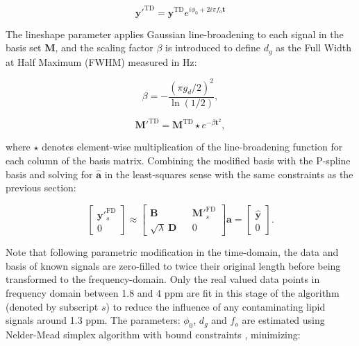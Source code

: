 \documentclass[num-refs]{wiley-article}
\begin{document}
\begin{equation}
  \mathbf{y'}^{\mathrm{TD}} = \mathbf{y}^{\mathrm{TD}} e^{i \phi_{0} + 2 i \pi f_{o} \mathbf{t}}
\end{equation}

The lineshape parameter applies Gaussian line-broadening to each signal in the basis set $\mathbf{M}$, and the scaling factor $\beta$ is introduced to define $d_{g}$ as the Full Width at Half Maximum (FWHM) measured in Hz:

\begin{equation}
  \beta = -\frac{{(\pi g_{d} / 2)}^{2}}{\ln(1/2)},
\end{equation}

\begin{equation}
  \mathbf{M}'^{\mathrm{TD}} = \mathbf{M}^{\mathrm{TD}} \star e^{-\beta \mathbf{t}^{2}},
\end{equation}

where $\star$ denotes element-wise multiplication of the line-broadening function for each column of the basis matrix. Combining the modified basis with the P-spline basis and solving for $\hat{\mathbf{a}}$ in the least-squares sense with the same constraints as the previous section:

\begin{equation}
  \begin{bmatrix}
    \textbf{y}'^{\mathrm{FD}}_{s} \\ 0
  \end{bmatrix}
  \approx
  \begin{bmatrix}
    \textbf{B} && \textbf{M}'^{\mathrm{FD}}_{s} \\ \sqrt{\lambda} \ \textbf{D} && 0
  \end{bmatrix} \hat{\mathbf{a}} =
  \begin{bmatrix}
    \hat{\textbf{y}} \\ 0
  \end{bmatrix}.
  \label{linear_fit}
\end{equation}

Note that following parametric modification in the time-domain, the data and basis of known signals are zero-filled to twice their original length before being transformed to the frequency-domain. Only the real valued data points in frequency domain between 1.8 and 4 ppm are fit in this stage of the algorithm (denoted by subscript $s$) to reduce the influence of any contaminating lipid signals around 1.3 ppm. The parameters: $\phi_{0}$, $d_{g}$ and $f_{o}$ are estimated using Nelder-Mead simplex algorithm with bound constraints \cite{Box1965}, minimizing:
\end{document}

